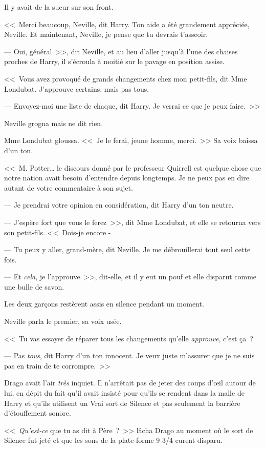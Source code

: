 Il y avait de la sueur sur son front.

<<~Merci beaucoup, Neville, dit Harry. Ton aide a été grandement appréciée, Neville. Et maintenant, Neville, je pense que tu devrais t'asseoir.

--- Oui, général~>>, dit Neville, et au lieu d'aller jusqu'à l'une des chaises proches de Harry, il s'écroula à moitié sur le pavage en position assise.

<<~Vous avez provoqué de grands changements chez mon petit-fils, dit Mme Londubat. J'approuve certains, mais pas tous.

--- Envoyez-moi une liste de chaque, dit Harry. Je verrai ce que je peux faire.~>>

Neville grogna mais ne dit rien.

Mme Londubat gloussa. <<~Je le ferai, jeune homme, merci.~>> Sa voix baissa d'un ton.

<<~M. Potter… le discours donné par le professeur Quirrell est quelque chose que notre nation avait besoin d'entendre depuis longtemps. Je ne peux pas en dire autant de votre commentaire à son sujet.

--- Je prendrai votre opinion en considération, dit Harry d'un ton neutre.

--- J'espère fort que vous le ferez~>>, dit Mme Londubat, et elle se retourna vers son petit-fils. <<~Dois-je encore -

--- Tu peux y aller, grand-mère, dit Neville. Je me débrouillerai tout seul cette fois.

--- Et \emph{cela}, je l'approuve~>>, dit-elle, et il y eut un pouf et elle disparut comme une bulle de savon.

Les deux garçons restèrent assis en silence pendant un moment.

Neville parla le premier, sa voix usée.

<<~Tu vas essayer de réparer tous les changements qu'elle \emph{approuve}, c'est ça~?

--- Pas \emph{tous}, dit Harry d'un ton innocent. Je veux juste m'assurer que je ne suis pas en train de te corrompre.~>>

\later

Drago avait l'air \emph{très} inquiet. Il n'arrêtait pas de jeter des coups d'œil autour de lui, en dépit du fait qu'il avait insisté pour qu'ils se rendent dans la malle de Harry et qu'ils utilisent un Vrai sort de Silence et pas seulement la barrière d'étouffement sonore.

<<~\emph{Qu'est-ce} que tu as dit à Père~?~>> lâcha Drago au moment où le sort de Silence fut jeté et que les sons de la plate-forme 9 3/4 eurent disparu.

